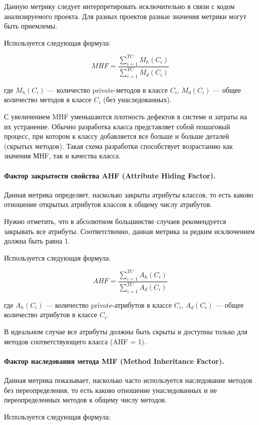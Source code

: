 \documentclass{../../text-style}
\begin{document}
Данную метрику следует интерпретировать исключительно в связи с кодом анализируемого проекта. Для разных проектов разные значения метрики могут быть приемлемы.

Используется следующая формула:

$$MHF = \frac{\sum\limits_{i=1}^{TC}M_h(C_i)}{\sum\limits_{i=1}^{TC}M_d(C_i)}$$

где $M_h(C_i)$ --- количество private-методов в классе $C_i$, $M_d(C_i)$ --- общее количество методов в классе $C_i$ (без унаследованных).

С увеличением MHF уменьшаются плотность дефектов в системе и затраты на их устранение. Обычно разработка класса представляет собой пошаговый процесс, при котором к классу добавляется все больше и больше деталей (скрытых методов). Такая схема разработки способствует возрастанию как значения МНF, так и качества класса.

\paragraph{Фактор закрытости свойства AHF (Attribute Hiding Factor).} Данная метрика определяет, насколько закрыты атрибуты классов, то есть каково отношение открытых атрибутов классов к общему числу атрибутов.

Нужно отметить, что в абсолютном большинстве случаев рекомендуется закрывать все атрибуты. Соответственно, данная метрика за редким исключением должна быть равна 1.

Используется следующая формула:

$$AHF = \frac{\sum\limits_{i=1}^{TC}A_h(C_i)}{\sum\limits_{i=1}^{TC}A_d(C_i)}$$

где $A_h(C_i)$ --- количество private-атрибутов в классе $C_i$, $A_d(C_i)$ --- общее количество атрибутов в классе $C_i$.

В идеальном случае все атрибуты должны быть скрыты и доступны только для методов соответствующего класса (AHF = 1).

\paragraph{Фактор наследования метода MIF (Method Inheritance Factor).} Данная метрика показывает, насколько часто используется наследование методов без переопределения, то есть каково отношение унаследованных и не переопределенных методов к общему числу методов.

Используется следующая формула:
\end{document}
